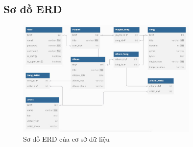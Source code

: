 \subsection{Sơ đồ ERD}
\begin{figure}[h]
    \centering
    \includegraphics[width=0.8\textwidth]{latex/imgs/erd.jpg}
    \caption{Sơ đồ ERD của cơ sở dữ liệu}
\end{figure}
